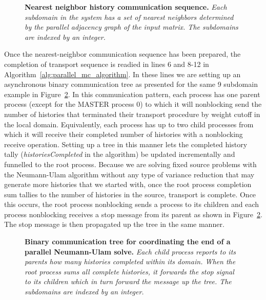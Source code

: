 \begin{figure}[t!]
  \begin{center}
    \scalebox{1.5}{  }
  \end{center}
  \caption{\textbf{Nearest neighbor history communication sequence.}
    \textit{Each subdomain in the system has a set of nearest
      neighbors determined by the parallel adjacency graph of the
      input matrix. The subdomains are indexed by an integer.}}
  \label{fig:nearest_neighbor_comm}
\end{figure}

Once the nearest-neighbor communication sequence has been prepared,
the completion of transport sequence is readied in lines 6 and 8-12 in
Algorithm~\ref{alg:parallel_mc_algorithm}. In these lines we are
setting up an asynchronous binary communication tree as presented for
the same 9 subdomain example in Figure~\ref{fig:binary_comm_tree}. In
this communication pattern, each process has one parent process
(except for the MASTER process 0) to which it will nonblocking send
the number of histories that terminated their transport procedure by
weight cutoff in the local domain. Equivalently, each process has up
to two child processes from which it will receive their completed
number of histories with a nonblocking receive operation. Setting up a
tree in this manner lets the completed history tally
(\textit{historiesCompleted} in the algorithm) be updated
incrementally and funnelled to the root process. Because we are
solving fixed source problems with the Neumann-Ulam algorithm without
any type of variance reduction that may generate more histories that
we started with, once the root process completion sum tallies to the
number of histories in the source, transport is complete. Once this
occurs, the root process nonblocking sends a process to its children
and each process nonblocking receives a stop message from its parent
as shown in Figure~\ref{fig:binary_comm_tree}. The stop message is
then propagated up the tree in the same manner.

\begin{figure}[t!]
  \begin{center}
    \scalebox{1.25}{
       }
    \caption{\textbf{Binary communication tree for coordinating the
        end of a parallel Neumann-Ulam solve.} \textit{Each child
        process reports to its parents how many histories completed
        within its domain. When the root process sums all complete
        histories, it forwards the stop signal to its children which
        in turn forward the message up the tree. The subdomains are
        indexed by an integer.}}
  \end{center}
  \label{fig:binary_comm_tree}
\end{figure}

